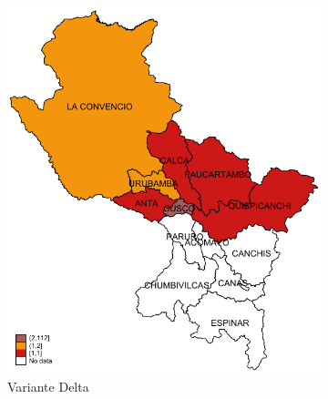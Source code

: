\documentclass[12pt,a4paper,openany]{book}
\begin{document}
\begin{figure}[h]
				\begin{subfigure}[b]{0.40\textwidth}
					\centering
					\includegraphics[width=\textwidth]{../figuras/variantes_provincial_delta.pdf}
					\caption{Variante Delta}
				\end{subfigure}
			\vspace{0.5mm}
			\hspace{25mm}
			\begin{subfigure}[b]{0.40\textwidth}
				\centering

\end{subfigure}
\end{figure}
\end{document}
